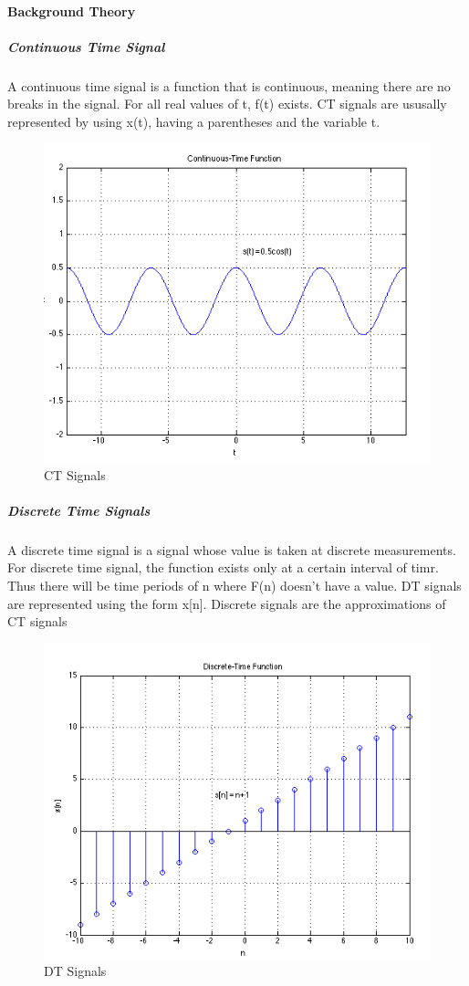 \documentclass[12pt]{article}
\begin{document}
\paragraph{Background Theory}
\subparagraph{Continuous Time Signal\\}
A continuous time signal is a function that is continuous, meaning there are no breaks in the signal. 
For all real values of t, f(t) exists.
CT signals are ususally represented by using x(t), having a parentheses and the variable t.
\begin{figure}[h!]
    \centering
    \includegraphics[scale = 0.5]{labss/Lab2_Th_CT.PNG}
    \caption{CT Signals}
\end{figure}
\subparagraph{Discrete Time Signals\\}
A discrete time signal is a signal whose value is taken at discrete measurements.
For discrete time signal, the function exists only at a certain interval of timr. 
Thus there will be time periods of n where F(n) doesn't have a value. 
DT signals are represented using the form x[n]. 
Discrete signals are the approximations of CT signals
\begin{figure}[h!]
    \centering
    \includegraphics[scale = 0.6]{labss/Lab2_Th_DT.PNG}
    \caption{DT Signals}
\end{figure}
\end{document}
